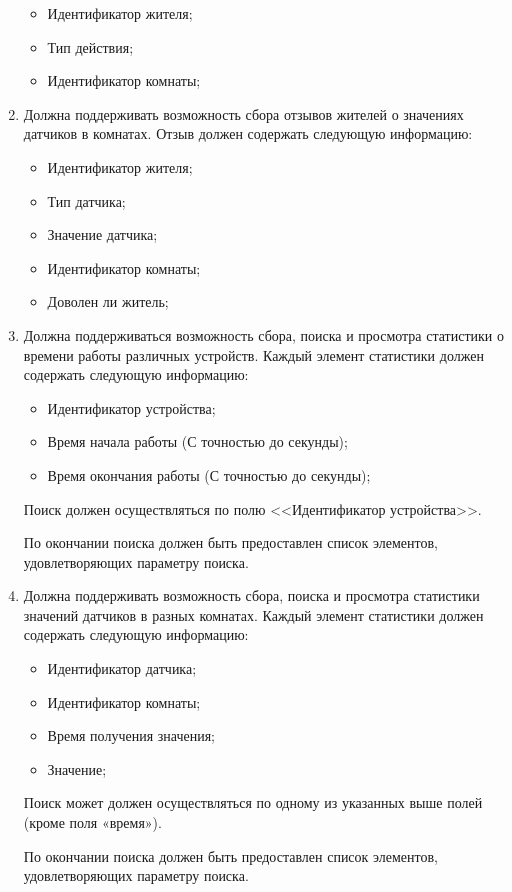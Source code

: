 \begin{enumerate}
            \begin{itemize}
              \item Идентификатор жителя;
	            \item Тип действия;
	            \item Идентификатор комнаты; 
            \end{itemize}
        \item Должна поддерживать возможность сбора отзывов жителей о значениях датчиков в комнатах. Отзыв должен содержать следующую  информацию: 
            \begin{itemize}
              \item Идентификатор жителя;
	            \item Тип датчика;
	            \item Значение датчика;
	            \item Идентификатор комнаты;
	            \item Доволен ли житель;
            \end{itemize}
        \item Должна поддерживаться возможность сбора, поиска и просмотра статистики о времени работы различных устройств. Каждый элемент статистики должен содержать следующую информацию:
          \begin{itemize}
            \item Идентификатор устройства;
            \item Время начала работы (С точностью до секунды);
            \item Время окончания работы (С точностью до секунды);
          \end{itemize}
                    
          Поиск должен осуществляться по полю <<Идентификатор устройства>>. 
          
          По окончании поиска должен быть предоставлен список элементов, удовлетворяющих параметру поиска.
        \item Должна поддерживать возможность сбора, поиска и просмотра статистики значений датчиков в разных комнатах. Каждый элемент статистики должен содержать следующую информацию:
          \begin{itemize}
            \item Идентификатор датчика;
	          \item Идентификатор комнаты;
	          \item Время получения значения;
	          \item Значение;
          \end{itemize}
          
          Поиск может должен осуществляться по одному из указанных выше полей (кроме поля «время»).
          
          По окончании поиска должен быть предоставлен список элементов, удовлетворяющих параметру поиска. 
      \end{enumerate}
